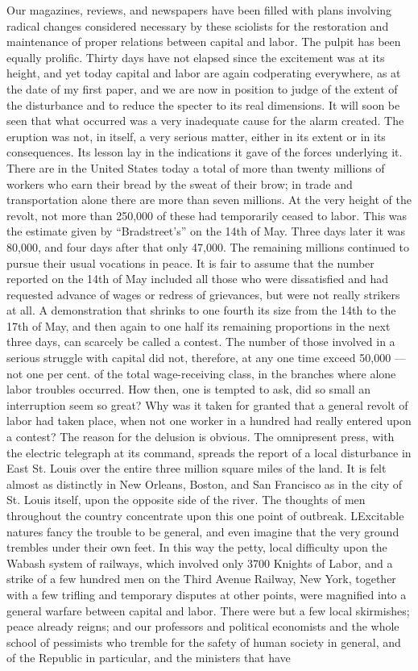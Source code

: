 \documentclass[11pt,openany]{book}
\begin{document}
Our magazines, reviews, and newspapers have been filled with plans involving radical changes considered necessary by these sciolists for the restoration and maintenance of proper relations between capital and labor. The pulpit has been equally prolific. Thirty days have not elapsed since the excitement was at its height, and yet today capital and labor are again codperating everywhere, as at the date of my first paper, and we are now in position to judge of the extent of the disturbance and to reduce the specter to its real dimensions. It will soon be seen that what occurred was a very inadequate cause for the alarm created. The eruption was not, in itself, a very serious matter, either in its extent or in its consequences. Its lesson lay in the indications it gave of the forces underlying it. There are in the United States today a total of more than twenty millions of workers who earn their bread by the sweat of their brow; in trade and transportation alone there are more than seven millions. At the very height of the revolt, not more than 250,000 of these had temporarily ceased to labor. This was the estimate given by ``Bradstreet's'' on the 14th of May. Three days later it was 80,000, and four days after that only 47,000. The remaining millions continued to pursue their usual vocations in peace. It is fair to assume that the number reported on the 14th of May included all those who were dissatisfied and had requested advance of wages or redress of grievances, but were not really strikers at all. A demonstration that shrinks to one fourth its size from the 14th to the 17th of May, and then again to one half its remaining proportions in the next three days, can scarcely be called a contest. The number of those involved in a serious struggle with capital did not, therefore, at any one time exceed 50,000 ---not one per cent. of the total wage-receiving class, in the branches where alone labor troubles occurred. How then, one is tempted to ask, did so small an interruption seem so great? Why was it taken for granted that a general revolt of labor had taken place, when not one worker in a hundred had really entered upon a contest? The reason for the delusion is obvious. The omnipresent press, with the electric telegraph at its command, spreads the report of a local disturbance in East St. Louis over the entire three million square miles of the land. It is felt almost as distinctly in New Orleans, Boston, and San Francisco as in the city of St. Louis itself, upon the opposite side of the river. The thoughts of men throughout the country concentrate upon this one point of outbreak. LExcitable natures fancy the trouble to be general, and even imagine that the very ground trembles under their own feet. In this way the petty, local difficulty upon the Wabash system of railways, which involved only 3700 Knights of Labor, and a strike of a few hundred men on the Third Avenue Railway, New York, together with a few trifling and temporary disputes at other points, were magnified into a general warfare between capital and labor. There were but a few local skirmishes; peace already reigns; and our professors and political economists and the whole school of pessimists who tremble for the safety of human society in general, and of the Republic in particular, and the ministers that have 
\end{document}
